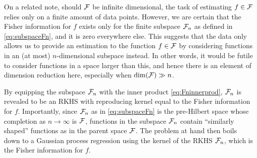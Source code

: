 \documentclass[showframe,11pt,twoside,openright]{report}
\begin{document}
On a related note, should ${\mathcal F}$ be infinite dimensional, the task of estimating $f\in{\mathcal F}$ relies only on a finite amount of data points.
However, we are certain that the Fisher information for $f$ exists only for the finite subspace ${\mathcal F}_n$ as defined in \cref{eq:subspaceFn}, and it is zero everywhere else.
This suggests that the data only allows us to provide an estimation to the function $f\in{\mathcal F}$ by considering functions in an (at most) $n$-dimensional subspace instead.
In other words, it would be futile to consider functions in a space larger than this, and hence there is an element of dimension reduction here, especially when $\dim({\mathcal F}) \gg n$.

By equipping the subspace ${\mathcal F}_n$ with the inner product \cref{eq:Fninnerprod}, ${\mathcal F}_n$ is revealed to be an RKHS with reproducing kernel equal to the Fisher information for $f$.
Importantly, since ${\mathcal F}_n$ as in \cref{eq:subspaceFn} is the pre-Hilbert space whose completion as $n\to\infty$ is ${\mathcal F}$, functions in the subspace ${\mathcal F}_n$ contain ``similarly shaped'' functions as in the parent space ${\mathcal F}$.
The problem at hand then boils down to a Gaussian process regression using the kernel of the RKHS ${\mathcal F}_n$, which is the Fisher information for $f$.

\hClosingStuffStandalone
\end{document}
